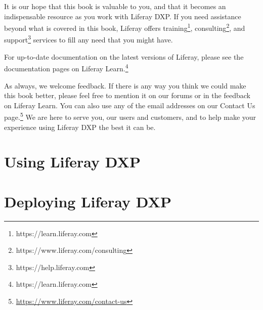 \documentclass[11pt,openright,twoside]{memoir}
\begin{document}
It is our hope that this book is valuable to you, and that it becomes an indispensable resource as you work with Liferay DXP. If you need assistance beyond what is covered in this book, Liferay offers training\footnote{https://learn.liferay.com}, consulting\footnote{https://www.liferay.com/consulting}, and support\footnote{https://help.liferay.com} services to fill any need that you might have. 

For up-to-date documentation on the latest versions of Liferay, please see the documentation pages on Liferay Learn.\footnote{https://learn.liferay.com} 

As always, we welcome feedback. If there is any way you think we could make this book better, please feel free to mention it on our forums or in the feedback on Liferay Learn. You can also
use any of the email addresses on our Contact Us page.\footnote{\href{http://www.liferay.com/contact-us}{https://www.liferay.com/contact-us}} We are here to serve you, our users and customers, and to help make your experience using Liferay DXP the best it can be.

\mainmatter
{}

\part{Using Liferay DXP}

\pagestyle{headings}



\part{Deploying Liferay DXP}

 
\end{document}
